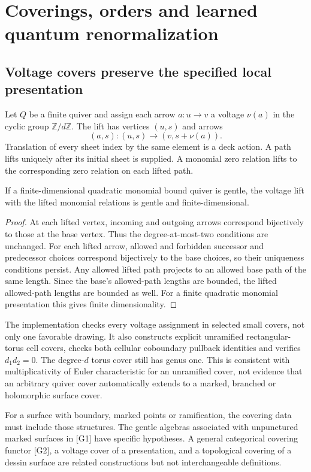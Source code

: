 \chapter{Coverings, orders and learned quantum renormalization}
\label{ch:p3-coverings}

\section{Voltage covers preserve the specified local presentation}

Let $Q$ be a finite quiver and assign each arrow $a:u\to v$ a voltage $\nu(a)$ in the cyclic group $\mathbb Z/d\mathbb Z$. The lift has vertices $(u,s)$ and arrows
\[
 (a,s):(u,s)\longrightarrow(v,s+\nu(a)).
\]
Translation of every sheet index by the same element is a deck action. A path lifts uniquely after its initial sheet is supplied. A monomial zero relation lifts to the corresponding zero relation on each lifted path.

\begin{proposition}
If a finite-dimensional quadratic monomial bound quiver is gentle, the voltage lift with the lifted monomial relations is gentle and finite-dimensional.
\end{proposition}
\begin{proof}
At each lifted vertex, incoming and outgoing arrows correspond bijectively to those at the base vertex. Thus the degree-at-most-two conditions are unchanged. For each lifted arrow, allowed and forbidden successor and predecessor choices correspond bijectively to the base choices, so their uniqueness conditions persist. Any allowed lifted path projects to an allowed base path of the same length. Since the base's allowed-path lengths are bounded, the lifted allowed-path lengths are bounded as well. For a finite quadratic monomial presentation this gives finite dimensionality.
\end{proof}

The implementation checks every voltage assignment in selected small covers, not only one favorable drawing. It also constructs explicit unramified rectangular-torus cell covers, checks both cellular coboundary pullback identities and verifies $d_1d_2=0$. The degree-$d$ torus cover still has genus one. This is consistent with multiplicativity of Euler characteristic for an unramified cover, not evidence that an arbitrary quiver cover automatically extends to a marked, branched or holomorphic surface cover.

For a surface with boundary, marked points or ramification, the covering data must include those structures. The gentle algebras associated with unpunctured marked surfaces in [G1] have specific hypotheses. A general categorical covering functor [G2], a voltage cover of a presentation, and a topological covering of a dessin surface are related constructions but not interchangeable definitions.

